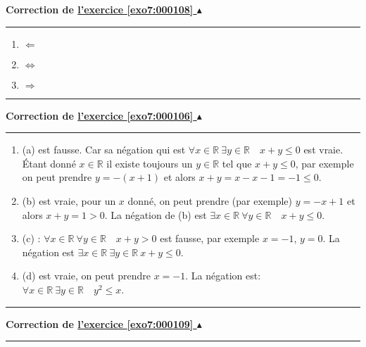 \documentclass[11pt,a4paper]{article}
\newcommand{\Rr}{\mathbb{R}} \newcommand{\R}{\mathbb{R}}
\newcounter{exo}
\newcommand{\correction}[1]{\hypertarget{cor7:#1}{}\label{cor7:#1}{\bf Correction de \hyperlink{exo7:#1}{l'exercice \ref{exo7:#1} $\blacktriangle$}}\vspace{1mm}\hrule\vspace{1mm}}
\newcommand{\fincorrection}{\vspace{1mm}\hrule\vspace*{7mm}}
\begin{document}
\correction{000108}
\begin{enumerate}
  \item $\Leftarrow$
  \item $\Leftrightarrow$
  \item $\Rightarrow$
\end{enumerate}
\fincorrection
\correction{000106}
\begin{enumerate}
\item (a) est fausse. Car sa n\'egation qui est 
 $\forall x\in \Rr \ \exists y\in \Rr \quad x+y \leq 0$
est vraie. \'Etant donn\'e $x\in \Rr$ il existe toujours un $y\in\Rr$ tel que
$x+y \leq 0$, par exemple on peut prendre $y=-(x+1)$ et alors $x+y=x-x-1=-1 \leq 0$.

\item (b) est vraie, pour un $x$ donn\'e, on peut prendre (par exemple) $y=-x+1$
et alors $x+y=1>0$.
La n\'egation de (b) est 
 $\exists x\in \Rr \ \forall y\in \Rr \quad x+y \leq 0$.

\item (c) : $\forall x\in \Rr \ \forall y\in \Rr \quad x+y > 0$
est fausse, par exemple $x=-1$, $y=0$. La n\'egation est 
$\exists x\in \Rr\ \exists y\in \Rr\ x+y \leq 0$.

\item (d) est vraie, on peut prendre $x=-1$. La n\'egation est:
$\forall x\in \Rr \ \exists y\in \Rr \quad y^2 \leq x$. 
\end{enumerate}
\fincorrection
\correction{000109}
\end{document}
